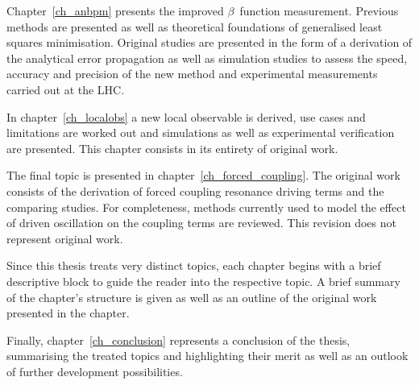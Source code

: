 Chapter~\ref{ch_anbpm} presents the improved $\beta$~function measurement. Previous methods are presented
as well as theoretical foundations of generalised least squares minimisation.
Original studies are presented in the form of a derivation of the analytical error propagation as well as 
simulation studies to assess the speed, accuracy and precision of the new method and experimental
measurements carried out at the LHC.

In chapter~\ref{ch_localobs} a new local observable is derived, use cases and limitations are worked out and
simulations as well as experimental verification are presented. This chapter consists in its entirety of 
original work.

The final topic is presented in chapter~\ref{ch_forced_coupling}. The original work consists of the
derivation of forced coupling resonance driving terms and the comparing studies. For completeness,
methods currently used to model the effect of driven oscillation on the coupling terms are reviewed.
This revision does not represent original work.

Since this thesis treats very distinct topics, each chapter begins with a brief descriptive block to guide
the reader into the respective topic. A brief summary of the chapter's structure is given as well as
an outline of the original work presented in the chapter. 

Finally, chapter~\ref{ch_conclusion} represents a conclusion of the thesis,
summarising the treated topics and highlighting their merit as well as an outlook of further development possibilities.
